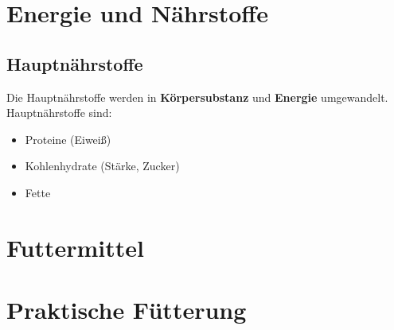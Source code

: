 \section{Energie und Nährstoffe}

    \subsection{Hauptnährstoffe}
        Die Hauptnährstoffe werden in \textbf{Körpersubstanz} und \textbf{Energie} umgewandelt. \\
        Hauptnährstoffe sind:
        \begin{itemize}
            \item Proteine (Eiweiß)
            \item Kohlenhydrate (Stärke, Zucker)
            \item Fette
        \end{itemize}

\section{Futtermittel}

\section{Praktische Fütterung}